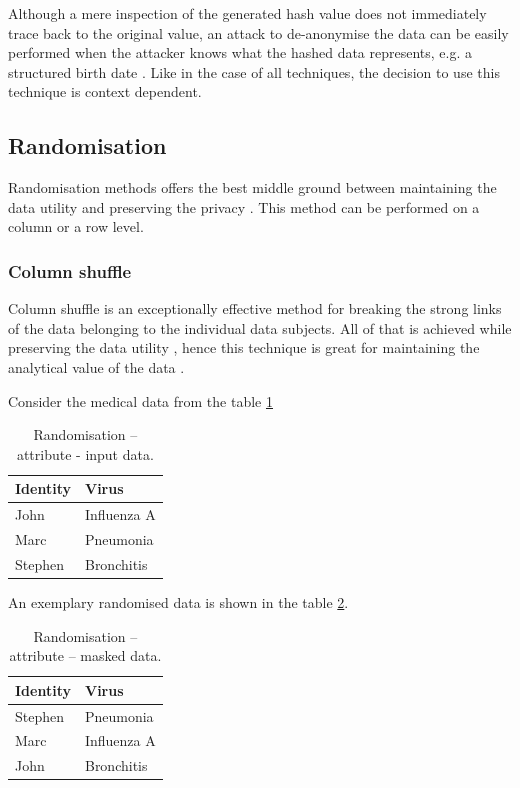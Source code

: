 \documentclass[a4paper,twoside,12pt]{book}
\begin{document}
Although a mere inspection of the generated hash value does not immediately trace back to the original value, an attack to de-anonymise the data can be easily performed when the attacker knows what the hashed data represents, e.g. a structured birth date \cite{bib:hash}. Like in the case of all techniques, the decision to use this technique is context dependent.

\subsection{Randomisation}

Randomisation methods offers the best middle ground between maintaining the data utility and preserving the privacy \cite{bib:data_shuffling}. This method can be performed on a column or a row level.

\subsubsection{Column shuffle}

Column shuffle is an exceptionally effective method for breaking the strong links of the data belonging to the individual data subjects. All of that is achieved while preserving the data utility \cite{bib:gdpr_handbook}, hence this technique is great for maintaining the analytical value of the data \cite{bib:data_shuffling}.

Consider the medical data from the table \ref{id:tab:attribute_randomisation_raw}

\begin{table}[h]
\centering
\caption{Randomisation – attribute - input data.}
\label{id:tab:attribute_randomisation_raw}
\begin{tabular}{ll}
\toprule
Identity & Virus        \\ \midrule
John     & Influenza A  \\
Marc     & Pneumonia    \\
Stephen  & Bronchitis   \\ \bottomrule
\end{tabular}
\end{table}

An exemplary randomised data is shown in the table \ref{id:tab:attribute_randomisation_masked}.

\begin{table}[h]
\centering
\caption{Randomisation – attribute – masked data.}
\label{id:tab:attribute_randomisation_masked}
\begin{tabular}{ll}
\toprule
Identity & Virus         \\ \midrule
Stephen  & Pneumonia     \\
Marc     &  Influenza A  \\
John     & Bronchitis    \\ \bottomrule
\end{tabular}
\end{table}
\end{document}
